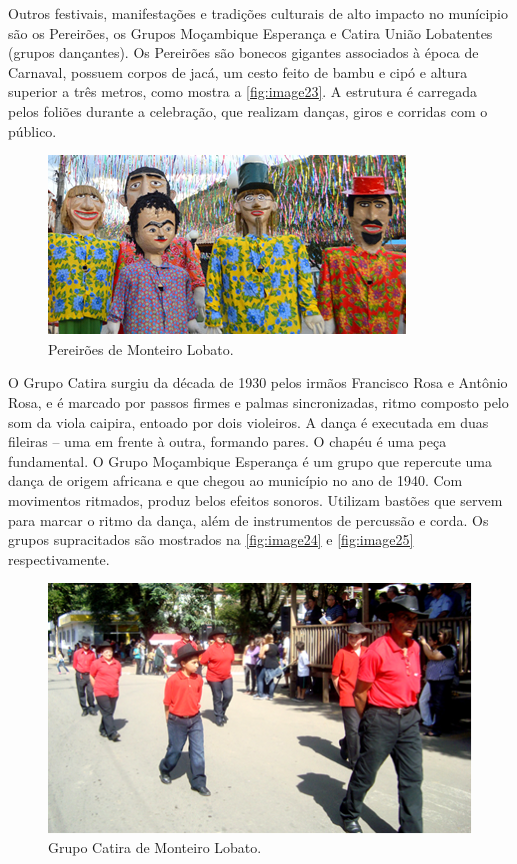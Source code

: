 Outros festivais, manifestações e tradições culturais de alto impacto no munícipio são os Pereirões, os Grupos Moçambique Esperança e Catira União Lobatentes (grupos dançantes). Os Pereirões são bonecos gigantes associados à época de Carnaval, possuem corpos de jacá, um cesto feito de bambu e cipó e altura superior a três metros, como mostra a \autoref{fig:image23}. A estrutura é carregada pelos foliões durante a celebração, que realizam danças, giros e corridas com o público.


 \begin{figure}[!h]
	\centering
	\includegraphics[width=0.85\linewidth]{produtos/proddois/image23}
	\caption{Pereirões de Monteiro Lobato.}
	\label{fig:image23}
\end{figure}

O Grupo Catira surgiu da década de 1930 pelos irmãos Francisco Rosa e Antônio Rosa, e é marcado por passos firmes e palmas sincronizadas, ritmo composto pelo som da viola caipira, entoado por dois violeiros. A dança é executada em duas fileiras – uma em frente à outra, formando pares. O chapéu é uma peça fundamental. O Grupo Moçambique Esperança é um grupo que repercute uma dança de origem africana e que chegou ao município no ano de 1940. Com movimentos ritmados, produz belos efeitos sonoros. Utilizam bastões que servem para marcar o ritmo da dança, além de instrumentos de percussão e corda. Os grupos supracitados são mostrados na \autoref{fig:image24} e \autoref{fig:image25} respectivamente.


 \begin{figure}[h!]
	\centering
	\includegraphics[width=0.85\linewidth]{produtos/proddois/image24}
	\caption{Grupo Catira de Monteiro Lobato.}
	\label{fig:image24}
\end{figure}

